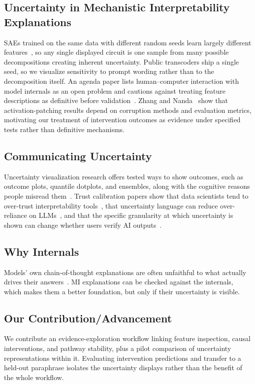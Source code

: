 \documentclass[sigconf,balance=false]{acmart}
\begin{document}
\subsection{Uncertainty in Mechanistic Interpretability Explanations}
SAEs trained on the same data with different random seeds learn largely
different features~\cite{paulo2026saes}, so any single displayed circuit is one
sample from many possible decompositions creating inherent uncertainty. Public transcoders ship a single seed, so we visualize sensitivity to prompt wording rather than to the decomposition itself. An agenda paper lists human--computer interaction with model internals as an open problem and cautions against treating feature descriptions as definitive before validation~\cite{sharkey2025open}. Zhang and Nanda~\cite{zhang2024patching} show that activation-patching results depend on corruption methods and evaluation metrics, motivating our treatment of intervention outcomes as evidence under specified tests rather than definitive mechanisms.

\subsection{Communicating Uncertainty}
Uncertainty visualization research offers tested ways to show outcomes, such as outcome plots, quantile dotplots, and ensembles, along with the cognitive reasons people misread them~\cite{padilla2022uncertainty}. Trust calibration papers show that data scientists tend to over-trust interpretability tools~\cite{kaur2020interpreting}, that uncertainty language can reduce over-reliance on LLMs~\cite{kim2024notsure}, and that the specific granularity at which uncertainty is shown can change whether users verify AI outputs~\cite{villavicencio2026granularity}.
\subsection{Why Internals}
Models' own chain-of-thought explanations are often unfaithful to what actually
drives their answers~\cite{turpin2023unfaithful}. MI explanations can be checked against the internals, which makes them a better foundation, but only if their uncertainty is visible.
\subsection{Our Contribution/Advancement}
We contribute an evidence-exploration workflow linking feature inspection, causal interventions, and pathway stability, plus a pilot comparison of uncertainty representations within it. Evaluating intervention predictions and transfer to a held-out paraphrase isolates the uncertainty displays rather than the benefit of the whole workflow.
\end{document}
